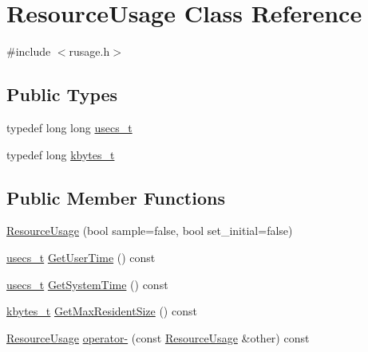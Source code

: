 \hypertarget{class_resource_usage}{\section{Resource\+Usage Class Reference}
\label{class_resource_usage}
}


{\ttfamily \#include $<$rusage.\+h$>$}

\subsection*{Public Types}
\begin{DoxyCompactItemize}
\item 
typedef long long \hyperlink{class_resource_usage_a836fea046a492cafcb5a1e4161b97b18}{usecs\+\_\+t}
\item 
typedef long \hyperlink{class_resource_usage_aa1679a8d0d180d8a2e9bc6b6718a79a4}{kbytes\+\_\+t}
\end{DoxyCompactItemize}
\subsection*{Public Member Functions}
\begin{DoxyCompactItemize}
\item 
\hyperlink{class_resource_usage_ac8a2f762be2c3352a5c3494cf5d27c88}{Resource\+Usage} (bool sample=false, bool set\+\_\+initial=false)
\item 
\hyperlink{class_resource_usage_a836fea046a492cafcb5a1e4161b97b18}{usecs\+\_\+t} \hyperlink{class_resource_usage_a47648773c5edb360a8d83f0422def985}{Get\+User\+Time} () const 
\item 
\hyperlink{class_resource_usage_a836fea046a492cafcb5a1e4161b97b18}{usecs\+\_\+t} \hyperlink{class_resource_usage_af7b1d49fdbe4e5a0330302dd9a31b060}{Get\+System\+Time} () const 
\item 
\hyperlink{class_resource_usage_aa1679a8d0d180d8a2e9bc6b6718a79a4}{kbytes\+\_\+t} \hyperlink{class_resource_usage_a1beabb43e656e96c709058950d980226}{Get\+Max\+Resident\+Size} () const 
\item 
\hyperlink{class_resource_usage}{Resource\+Usage} \hyperlink{class_resource_usage_a571cd8d911ff708469d2145b0da07635}{operator-\/} (const \hyperlink{class_resource_usage}{Resource\+Usage} \&other) const 
\end{DoxyCompactItemize}


